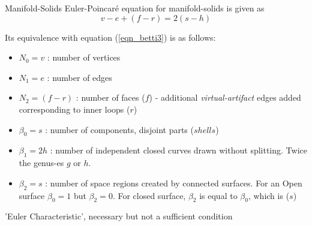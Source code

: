 \begin{frame}{Manifold-Solids}
Euler-Poincar\'e equation for manifold-solids is given as 
\begin{equation}
v - e + (f - r) = 2 (s - h)
\label{eqn_manifold}
\end{equation}

Its equivalence with equation (\ref{eqn_betti3}) is as follows:

\begin{itemize}[noitemsep,label=\textbullet,topsep=2pt,parsep=2pt,partopsep=2pt]
\item $N_{0} = v $ : number of vertices
\item $N_{1} = e $ : number of edges
\item $N_{2} = (f - r)$ : number of faces ($f$) - additional {\em virtual-artifact} edges added corresponding to inner loops ($r$)
\item $\beta_{0} = s$ : number of components, disjoint parts ($shells$)
\item $\beta_{1} = 2h$ : number of independent closed curves drawn without splitting. Twice the genus-es $g$ or $h$. %
\item $\beta_{2} = s$ : number of space regions created by connected surfaces. For an Open surface $\beta_{0} = 1$ but $\beta_{2}=0$. For closed surface,  $\beta_{2}$ is equal to $\beta_{0}$,  which is ($s$)
\end{itemize}

'Euler Characteristic', necessary but not a sufficient condition%
\end{frame}

